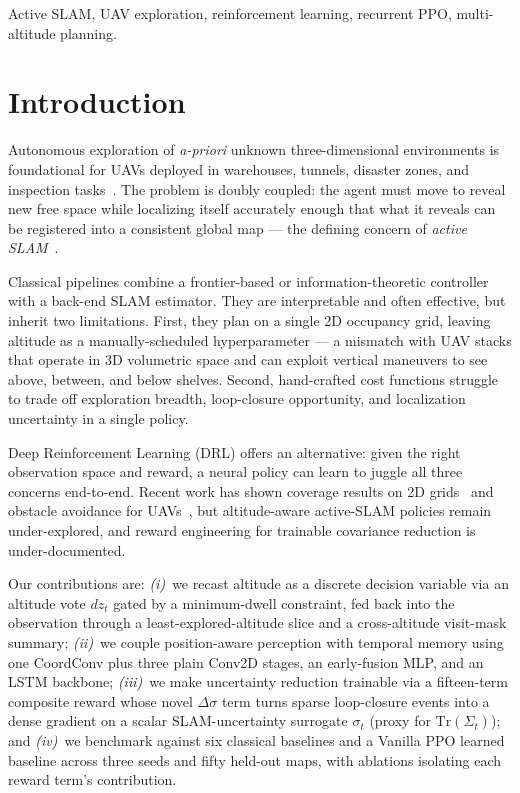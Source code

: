 \documentclass[conference]{IEEEtran}
\begin{document}
\begin{IEEEkeywords}
Active SLAM, UAV exploration, reinforcement learning, recurrent PPO, multi-altitude planning.
\end{IEEEkeywords}

\section{Introduction}

Autonomous exploration of \emph{a-priori} unknown three-dimensional environments is foundational for UAVs deployed in warehouses, tunnels, disaster zones, and inspection tasks~\cite{qin2019autonomous, zhang2026adaptive}. The problem is doubly coupled: the agent must move to reveal new free space while localizing itself accurately enough that what it reveals can be registered into a consistent global map --- the defining concern of \emph{active SLAM}~\cite{placed2023survey, zhang2026u}.

Classical pipelines combine a frontier-based or information-theoretic controller with a back-end SLAM estimator. They are interpretable and often effective, but inherit two limitations. First, they plan on a single 2D occupancy grid, leaving altitude as a manually-scheduled hyperparameter --- a mismatch with UAV stacks that operate in 3D volumetric space and can exploit vertical maneuvers to see above, between, and below shelves. Second, hand-crafted cost functions struggle to trade off exploration breadth, loop-closure opportunity, and localization uncertainty in a single policy.

Deep Reinforcement Learning (DRL) offers an alternative: given the right observation space and reward, a neural policy can learn to juggle all three concerns end-to-end. Recent work has shown coverage results on 2D grids~\cite{yin2025maslam,chen2024lidar,zhao2024ddpg} and obstacle avoidance for UAVs~\cite{xu2025navrl}, but altitude-aware active-SLAM policies remain under-explored, and reward engineering for trainable covariance reduction is under-documented.

Our contributions are: \emph{(i)}~we recast altitude as a discrete decision variable via an altitude vote $dz_t$ gated by a minimum-dwell constraint, fed back into the observation through a least-explored-altitude slice and a cross-altitude visit-mask summary; \emph{(ii)}~we couple position-aware perception with temporal memory using one CoordConv plus three plain Conv2D stages, an early-fusion MLP, and an LSTM backbone; \emph{(iii)}~we make uncertainty reduction trainable via a fifteen-term composite reward whose novel $\Delta\sigma$ term turns sparse loop-closure events into a dense gradient on a scalar SLAM-uncertainty surrogate $\sigma_t$ (proxy for $\mathrm{Tr}(\Sigma_t)$); and \emph{(iv)}~we benchmark against six classical baselines and a Vanilla PPO learned baseline across three seeds and fifty held-out maps, with ablations isolating each reward term's contribution.
\end{document}
